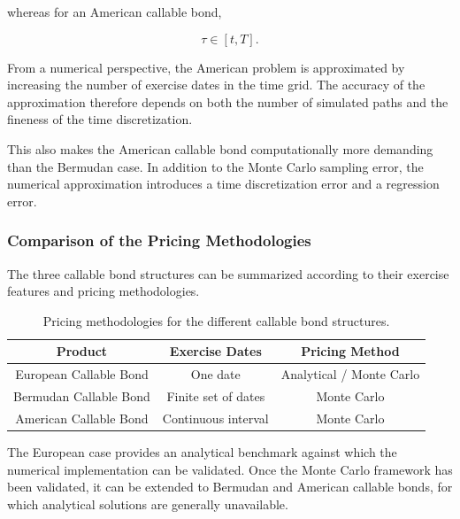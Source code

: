 \documentclass{article}
\begin{document}
whereas for an American callable bond,

\begin{equation}
    \tau
    \in
    [t,T].
\end{equation}

From a numerical perspective, the American problem is approximated
by increasing the number of exercise dates in the time grid. The
accuracy of the approximation therefore depends on both the number
of simulated paths and the fineness of the time discretization.

This also makes the American callable bond computationally more
demanding than the Bermudan case. In addition to the Monte Carlo
sampling error, the numerical approximation introduces a time
discretization error and a regression error.



\subsubsection{Comparison of the Pricing Methodologies}

The three callable bond structures can be summarized according to
their exercise features and pricing methodologies.

\begin{table}[h!]
\centering
\begin{tabular}{|c|c|c|}
\hline
\textbf{Product} & \textbf{Exercise Dates} & \textbf{Pricing Method} \\
\hline
European Callable Bond
& One date
& Analytical / Monte Carlo \\
\hline
Bermudan Callable Bond
& Finite set of dates
& Monte Carlo \\
\hline
American Callable Bond
& Continuous interval
& Monte Carlo \\
\hline
\end{tabular}
\caption{Pricing methodologies for the different callable bond structures.}
\label{tab:callable_methods}
\end{table}

The European case provides an analytical benchmark against which
the numerical implementation can be validated. Once the Monte Carlo
framework has been validated, it can be extended to Bermudan and
American callable bonds, for which analytical solutions are
generally unavailable.
\end{document}

